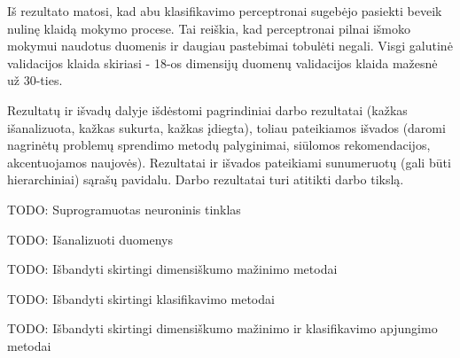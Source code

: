 \documentclass{VUMIFPSbakalaurinis}
\newcommand{\TODO}[1]{
\colorbox{todo-background-color}{TODO: #1}
}
\begin{document}
Iš rezultato matosi, kad abu klasifikavimo perceptronai sugebėjo pasiekti beveik nulinę klaidą mokymo procese.
Tai reiškia, kad perceptronai pilnai išmoko mokymui naudotus duomenis ir daugiau pastebimai tobulėti negali.
Visgi galutinė validacijos klaida skiriasi - 18-os dimensijų duomenų validacijos klaida mažesnė už 30-ties.


Rezultatų ir išvadų dalyje išdėstomi pagrindiniai darbo rezultatai (kažkas
išanalizuota, kažkas sukurta, kažkas įdiegta), toliau pateikiamos išvados
(daromi nagrinėtų problemų sprendimo metodų palyginimai, siūlomos
rekomendacijos, akcentuojamos naujovės). Rezultatai ir išvados pateikiami
sunumeruotų (gali būti hierarchiniai) sąrašų pavidalu. Darbo rezultatai turi
atitikti darbo tikslą.

\TODO{Suprogramuotas neuroninis tinklas}
\TODO{Išanalizuoti duomenys}
\TODO{Išbandyti skirtingi dimensiškumo mažinimo metodai}
\TODO{Išbandyti skirtingi klasifikavimo metodai}
\TODO{Išbandyti skirtingi dimensiškumo mažinimo ir klasifikavimo apjungimo metodai}


\printbibliography[heading=bibintoc]  %

\end{document}
